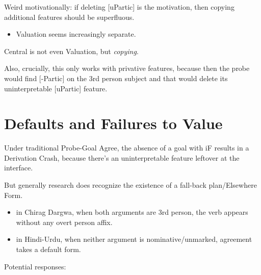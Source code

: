 Weird motivationally: if deleting [uPartic] is the motivation, then copying additional features should be superfluous.

\begin{itemize}
  \item Valuation seems increasingly separate.
\end{itemize}

Central is not even Valuation, but \textit{copying}.

Also, crucially, this only works with privative features, because then the probe would find [-Partic] on the 3rd person subject and that would delete its uninterpretable [uPartic] feature.

\section*{Defaults and Failures to Value}

Under traditional Probe-Goal Agree, the absence of a goal with iF results in a Derivation Crash, because there's an uninterpretable feature leftover at the interface.

But generally research does recognize the existence of a fall-back plan/Elsewhere Form.

\begin{itemize}
  \item in Chirag Dargwa, when both arguments are 3rd person, the verb appears without any overt person affix.
  \item in Hindi-Urdu, when neither argument is nominative/unmarked, agreement takes a default form.
\end{itemize}

Potential responses:

